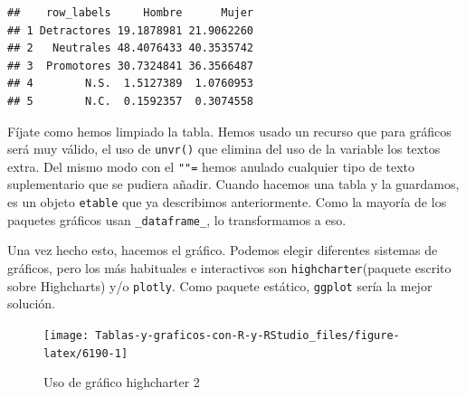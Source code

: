 \documentclass[
]{book}
\newenvironment{Shaded}{\begin{snugshade}}{\end{snugshade}}
\newcommand{\AttributeTok}[1]{\textcolor[rgb]{0.77,0.63,0.00}{#1}}
\newcommand{\ConstantTok}[1]{\textcolor[rgb]{0.00,0.00,0.00}{#1}}
\newcommand{\FunctionTok}[1]{\textcolor[rgb]{0.00,0.00,0.00}{#1}}
\newcommand{\NormalTok}[1]{#1}
\newcommand{\SpecialCharTok}[1]{\textcolor[rgb]{0.00,0.00,0.00}{#1}}
\newcommand{\StringTok}[1]{\textcolor[rgb]{0.31,0.60,0.02}{#1}}
\begin{document}
\begin{verbatim}
##    row_labels     Hombre      Mujer
## 1 Detractores 19.1878981 21.9062260
## 2   Neutrales 48.4076433 40.3535742
## 3  Promotores 30.7324841 36.3566487
## 4        N.S.  1.5127389  1.0760953
## 5        N.C.  0.1592357  0.3074558
\end{verbatim}

Fíjate como hemos limpiado la tabla. Hemos usado un recurso que para gráficos será muy válido, el uso de \texttt{unvr()} que elimina del uso de la variable los textos extra. Del mismo modo con el \texttt{"\textbar{}"=} hemos anulado cualquier tipo de texto suplementario que se pudiera añadir. Cuando hacemos una tabla y la guardamos, es un objeto \texttt{etable} que ya describimos anteriormente. Como la mayoría de los paquetes gráficos usan \texttt{\_dataframe\_}, lo transformamos a eso.

Una vez hecho esto, hacemos el gráfico. Podemos elegir diferentes sistemas de gráficos, pero los más habituales e interactivos son \texttt{highcharter}(paquete escrito sobre Highcharts) y/o \texttt{plotly}. Como paquete estático, \texttt{ggplot} sería la mejor solución.

\begin{Shaded}
\end{Shaded}

\begin{figure}[H]

{\centering \texttt{[image: Tablas-y-graficos-con-R-y-RStudio\_files/figure-latex/6190-1]} 

}

\caption{Uso de gráfico highcharter 2}\label{fig:6190}
\end{figure}
\end{document}

